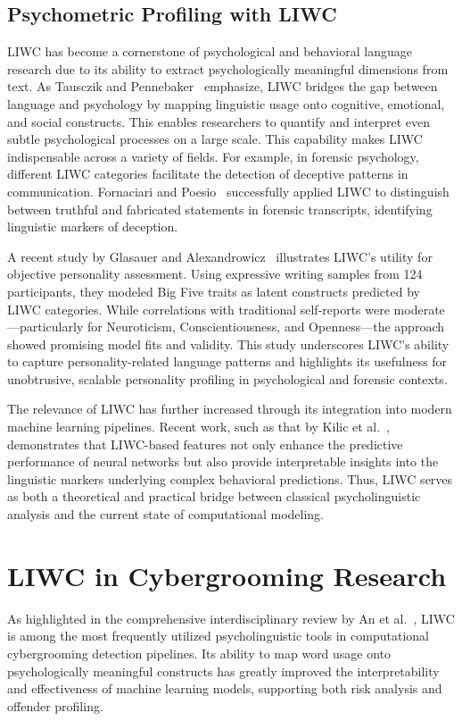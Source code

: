 \subsection{Psychometric Profiling with LIWC}

LIWC has become a cornerstone of psychological and behavioral language research due to its ability to extract psychologically meaningful dimensions from text. As Tausczik and Pennebaker~\cite{tausczik2010psychological} emphasize, LIWC bridges the gap between language and psychology by mapping linguistic usage onto cognitive, emotional, and social constructs. This enables researchers to quantify and interpret even subtle psychological processes on a large scale. This capability makes LIWC indispensable across a variety of fields. For example, in forensic psychology, different LIWC categories facilitate the detection of deceptive patterns in communication. Fornaciari and Poesio~\cite{fornaciari2013automatic} successfully applied LIWC to distinguish between truthful and fabricated statements in forensic transcripts, identifying linguistic markers of deception. %

A recent study by Glasauer and Alexandrowicz~\cite{glasauer2022bigfive} illustrates LIWC’s utility for objective personality assessment. Using expressive writing samples from 124 participants, they modeled Big Five traits as latent constructs predicted by LIWC categories. While correlations with traditional self-reports were moderate—particularly for Neuroticism, Conscientiousness, and Openness—the approach showed promising model fits and validity. This study underscores LIWC’s ability to capture personality-related language patterns and highlights its usefulness for unobtrusive, scalable personality profiling in psychological and forensic contexts. %

The relevance of LIWC has further increased through its integration into modern machine learning pipelines. Recent work, such as that by Kilic et al.~\cite{yakut-kilic-pan-2022-incorporating}, demonstrates that LIWC-based features not only enhance the predictive performance of neural networks but also provide interpretable insights into the linguistic markers underlying complex behavioral predictions. Thus, LIWC serves as both a theoretical and practical bridge between classical psycholinguistic analysis and the current state of computational modeling. %


\section{LIWC in Cybergrooming Research}
 As highlighted in the comprehensive interdisciplinary review by An et al.~\cite{an2025cybergrooming}, LIWC is among the most frequently utilized psycholinguistic tools in computational cybergrooming detection pipelines. Its ability to map word usage onto psychologically meaningful constructs has greatly improved the interpretability and effectiveness of machine learning models, supporting both risk analysis and offender profiling. %
 
